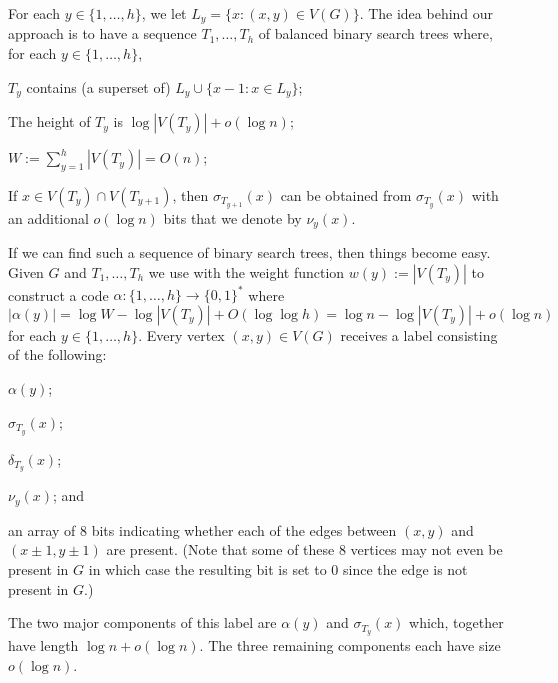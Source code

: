 \documentclass[kpfonts]{patmorin}
\begin{document}
For each $y\in\{1,\ldots,h\}$, we let $L_y=\{x:(x,y)\in V(G)\}$.  The idea behind our approach is to have a sequence $T_1,\ldots,T_h$ of balanced binary search trees where, for each $y\in\{1,\ldots,h\}$,
\begin{compactenum}[(PR1)]
  \item $T_y$ contains (a superset of) $L_y\cup \{x-1:x\in L_y\}$;
  \item The height of $T_y$ is $\log |V(T_y)| + o(\log n)$;
  \item $W:=\sum_{y=1}^h |V(T_y)| = O(n)$;
  \item If $x\in V(T_y)\cap V(T_{y+1})$, then $\sigma_{T_{y+1}}(x)$ can be obtained from $\sigma_{T_{y}}(x)$ with an additional $o(\log n)$ bits that we denote by $\nu_y(x)$. 
\end{compactenum}
If we can find such a sequence of binary search trees, then things become easy.  Given $G$ and $T_{1},\ldots,T_h$ we use  with the weight function $w(y):=|V(T_y)|$ to construct a code $\alpha:\{1,\ldots,h\}\to\{0,1\}^*$ where
\[  
  |\alpha(y)| = \log W-\log|V(T_y)| + O(\log\log h) = \log n - \log|V(T_y)| + o(\log n)
\]
for each $y\in\{1,\ldots,h\}$.  Every vertex $(x,y)\in V(G)$ receives a label consisting of the following:
\begin{compactenum}
  \item $\alpha(y)$;
  \item $\sigma_{T_y}(x)$;    
  \item $\delta_{T_y}(x)$;
  \item $\nu_y(x)$; and
  \item an array of $8$ bits indicating whether each of the edges between $(x,y)$ and $(x\pm 1,y\pm 1)$ are present.  (Note that some of these 8 vertices may not even be present in $G$ in which case the resulting bit is set to 0 since the edge is not present in $G$.)
\end{compactenum}
The two major components of this label are $\alpha(y)$ and $\sigma_{T_y}(x)$ which, together have length $\log n + o(\log n)$.  The three remaining components each have size $o(\log n)$.
\end{document}
